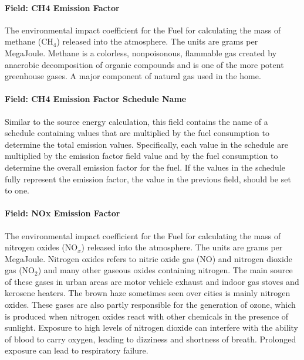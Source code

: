 \paragraph{Field: CH4 Emission Factor}\label{field-ch4-emission-factor}

The environmental impact coefficient for the Fuel for calculating the mass of methane (CH\(_{4}\)) released into the atmosphere. The units are grams per MegaJoule. Methane is a colorless, nonpoisonous, flammable gas created by anaerobic decomposition of organic compounds and is one of the more potent greenhouse gases. A major component of natural gas used in the home.

\paragraph{Field: CH4 Emission Factor Schedule Name}\label{field-ch4-emission-factor-schedule-name}

Similar to the source energy calculation, this field contains the name of a schedule containing values that are multiplied by the fuel consumption to determine the total emission values. Specifically, each value in the schedule are multiplied by the emission factor field value and by the fuel consumption to determine the overall emission factor for the fuel. If the values in the schedule fully represent the emission factor, the value in the previous field, should be set to one.

\paragraph{Field: NOx Emission Factor}\label{field-nox-emission-factor}

The environmental impact coefficient for the Fuel for calculating the mass of nitrogen oxides (NO\(_{x}\)) released into the atmosphere. The units are grams per MegaJoule. Nitrogen oxides refers to nitric oxide gas (NO) and nitrogen dioxide gas (NO\(_{2}\)) and many other gaseous oxides containing nitrogen. The main source of these gases in urban areas are motor vehicle exhaust and indoor gas stoves and kerosene heaters. The brown haze sometimes seen over cities is mainly nitrogen oxides. These gases are also partly responsible for the generation of ozone, which is produced when nitrogen oxides react with other chemicals in the presence of sunlight. Exposure to high levels of nitrogen dioxide can interfere with the ability of blood to carry oxygen, leading to dizziness and shortness of breath. Prolonged exposure can lead to respiratory failure.

